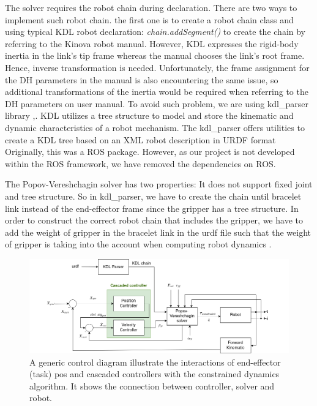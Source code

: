 \documentclass[report.tex]{subfiles}
\begin{document}
    The solver requires the robot chain during declaration. There are two ways to implement such robot chain. the first one is to create a robot chain class and using typical KDL robot declaration: \textit{chain.addSegment()} to create the chain by referring to the Kinova robot manual. However, KDL expresses the rigid-body inertia in the link's tip frame whereas the manual chooses the link's root frame. Hence, inverse transformation is needed. Unfortunately, the frame assignment for the DH parameters in the manual is also encountering the same issue, so additional transformations of the inertia would be required when referring to the DH parameters on user manual. To avoid such problem, we are using kdl\_parser library \cite{kdl_parser},\cite{roskdlparser}. KDL utilizes a tree structure to model and store the kinematic and dynamic characteristics of a robot mechanism. The kdl\_parser offers utilities to create a KDL tree based on an XML robot description in URDF format Originally, this was a ROS package. However, as our project is not developed within the ROS framework, we have removed the dependencies on ROS.

    The Popov-Vereshchagin solver has two properties: It does not support fixed joint and tree structure. So in kdl\_parser, we have to create the chain until bracelet link instead of the end-effector frame since the gripper has a tree structure. In order to construct the correct robot chain that includes the gripper, we have to add the weight of gripper in the bracelet link in the urdf file such that the weight of gripper is taking into the account when computing robot dynamics \cite{gripper}.
    \begin{figure}[h]
        \centering
        \includegraphics[width=1\linewidth]{images/system_arch.png}
        \caption{A generic control diagram illustrate the interactions of end-effector (task)
        pos and cascaded controllers with the constrained dynamics
        algorithm. It shows the connection between controller, solver and robot.}
        \label{fig:sys}
    \end{figure}
\end{document}
